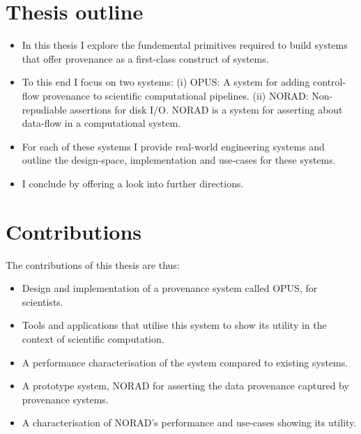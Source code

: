 \documentclass[withindex,glossary]{cam-thesis}
\begin{document}
\section{Thesis outline}
\begin{itemize}
\item In this thesis I explore the fundemental primitives required to build systems that offer provenance as a first-class construct
of systems.
\item To this end I focus on two systems:
(i) OPUS: A system for adding control-flow provenance to scientific computational pipelines.
(ii) NORAD: Non-repudiable assertions for disk I/O. NORAD is a system for asserting about data-flow in a computational system.
\item For each of these systems I provide real-world engineering systems and outline the design-space, implementation and use-cases for these systems.
\item I conclude by offering a look into further directions.
\end{itemize}

\section{Contributions}
The contributions of this thesis are thus:
\begin{itemize}
\item Design and implementation of a provenance system called OPUS, for scientists.
\item Tools and applications that utilise this system to show its utility in the context of scientific computation.
\item A performance characterisation of the system compared to existing systems.
\item A prototype system, NORAD for asserting the data provenance captured by provenance systems.
\item A characterisation of NORAD's performance and use-cases showing its utility.
\end{itemize}
\end{document}
